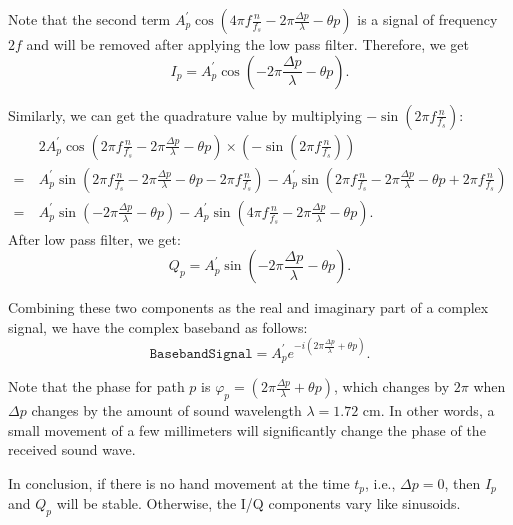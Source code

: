 Note that the second term $A^\prime_p \cos \left(4\pi f \frac{n}{f_s}  - 2 \pi \frac{\Delta p}{\lambda} - \theta p \right) $ is a signal of frequency $2f$ and will be removed after applying the low pass filter. Therefore, we get 
\begin{displaymath}
I_p = A^\prime_p \cos \left( - 2 \pi \frac{\Delta p}{\lambda} - \theta p \right) .
\end{displaymath}

Similarly, we can get the quadrature value by multiplying $-\sin \left (2\pi f \frac{n}{f_s}\right)$:
\begin{align*}
&2A^\prime_p \cos \left (2\pi f \frac{n}{f_s}  - 2 \pi \frac{\Delta p}{\lambda} - \theta p\right) \times \left(- \sin \left (2\pi f \frac{n}{f_s}\right)\right)\\        
=~&A^\prime_p \sin \left (2\pi f \frac{n}{f_s}  - 2 \pi \frac{\Delta p}{\lambda} - \theta p - 2\pi f \frac{n}{f_s}\right)  - A^\prime_p \sin \left (2\pi f \frac{n}{f_s}  - 2 \pi \frac{\Delta p}{\lambda} - \theta p + 2\pi f \frac{n}{f_s}\right)  \\
=~&A^\prime_p \sin \left( - 2 \pi \frac{\Delta p}{\lambda} - \theta p \right)  -  A^\prime_p \sin \left(4\pi f \frac{n}{f_s}  - 2 \pi \frac{\Delta p}{\lambda} - \theta p \right)   .
\end{align*}
After low pass filter, we get:
\begin{displaymath}
Q_p = A^\prime_p \sin \left( - 2 \pi \frac{\Delta p}{\lambda} - \theta p \right) .
\end{displaymath}


Combining these two components as the real and imaginary part of a complex signal, we have the complex baseband as follows: 
\begin{displaymath}
\texttt{BasebandSignal} = A^\prime_p e^{-i \left(2 \pi \frac{\Delta p}{\lambda} + \theta p\right)}.
\end{displaymath}

Note that the phase for path $p$ is $\varphi_p = \left(2 \pi \frac{\Delta p}{\lambda} + \theta p\right)$, which changes by $2\pi$ when $\Delta p$ changes by the amount of sound wavelength $\lambda = 1.72 \text{~cm}$. In other words, a small
movement of a few millimeters will significantly change the phase of the received sound wave. 

In conclusion, if there is no hand movement at the time $t_p$, i.e., $\Delta p = 0$,  then $I_p$ and $Q_p$ will be stable. Otherwise, the I/Q components vary like sinusoids.

